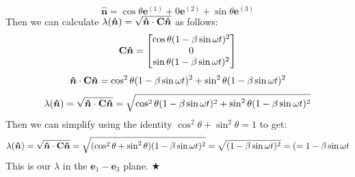 \begin{equation}
    \bm{\hat{n}} = \cos{\theta}\bm{e}^{(1)} + 0\bm{e}^{(2)} + \sin{\theta}\bm{e}^{(3)}
\end{equation}
Then we can calculate $ \lambda (\bm{\hat{n}}) = \sqrt{\bm{\hat{n}} \cdot \mathbf{C} \bm{\hat{n}}}$ as follows:
\begin{equation}
    \mathbf{C}\bm{\hat{n}} = 
    \begin{bmatrix}
        \cos{\theta}(1 - \beta \sin{\omega t})^2 \\
        0 \\
         \sin{\theta}(1 - \beta \sin{\omega t})^2
    \end{bmatrix}
\end{equation}
\begin{equation}
    \bm{\hat{n}} \cdot \mathbf{C}\bm{\hat{n}} = 
        \cos^2{\theta}(1 - \beta \sin{\omega t})^2 + \sin^2{\theta}(1 - \beta \sin{\omega t})^2
\end{equation}
\begin{equation}
    \lambda (\bm{\hat{n}}) = \sqrt{\bm{\hat{n}} \cdot \mathbf{C} \bm{\hat{n}}} =  
        \sqrt{\cos^2{\theta}(1 - \beta \sin{\omega t})^2 + \sin^2{\theta}(1 - \beta \sin{\omega t})^2}
\end{equation}
Then we can simplify using the identity $\cos^2{\theta} + \sin^2{\theta} = 1$ to get:
\begin{equation}
    \lambda (\bm{\hat{n}}) = \sqrt{\bm{\hat{n}} \cdot \mathbf{C} \bm{\hat{n}}} =  
        \sqrt{ (\cos^2{\theta} + \sin^2{\theta})(1 - \beta \sin{\omega t})^2} = \sqrt{ (1 - \beta \sin{\omega t})^2} = (=1 - \beta \sin{\omega t}
\end{equation}
This is our $\lambda$ in the $\bm{e}_1- \bm{e}_3$ plane.
\hspace*{\fill} $\bigstar$

